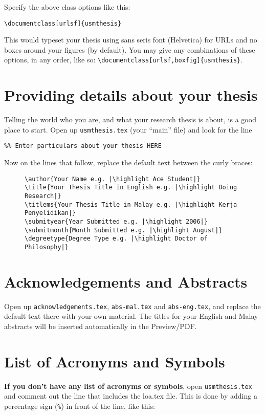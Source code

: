 Specify the above class options like this:

\begin{lstlisting}
\documentclass[urlsf]{usmthesis}
\end{lstlisting}

This would typeset your thesis using sans seris font (Helvetica) for URLs and no boxes around your figures (by default). You may give any combinations of these options, in any order, like so: \lstinline|\documentclass[urlsf,boxfig]{usmthesis}|.


\section{Providing details about your thesis}

Telling the world who you are, and what your research thesis is about, is a good place to start. Open up \texttt{usmthesis.tex} (your ``main'' file) and look for the line

\lstinline|%% Enter particulars about your thesis HERE|

Now on the lines that follow, replace the default text between the curly braces:

\newcommand{\highlight}{\color{blue}\rmfamily}
\begin{figure}[hbt!]
\begin{lstlisting}[escapechar=|,morekeywords={titlems,submityear,submitmonth,degreetype}]
\author{Your Name e.g. |\highlight Ace Student|}
\title{Your Thesis Title in English e.g. |\highlight Doing Research|}
\titlems{Your Thesis Title in Malay e.g. |\highlight Kerja Penyelidikan|} 
\submityear{Year Submitted e.g. |\highlight 2006|}
\submitmonth{Month Submitted e.g. |\highlight August|} 
\degreetype{Degree Type e.g. |\highlight Doctor of Philosophy|}
\end{lstlisting}
\end{figure}


\section{Acknowledgements and Abstracts}
Open up \texttt{acknowledgements.tex}, \texttt{abs-mal.tex} and \texttt{abs-eng.tex}, and replace the default text there with your own material. The titles for your English and Malay abstracts will be inserted automatically in the Preview/PDF.


\section{List of Acronyms and Symbols}
\textbf{If you don't have any list of acronyms or symbols}, open \texttt{usmthesis.tex} and comment out the line that includes the loa.tex file. This is done by adding a percentage sign (\verb|%|) in front of the line, like this:

